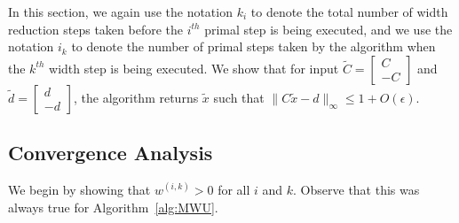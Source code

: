 \documentclass[11pt]{article}
\newcommand\dd{\boldsymbol{\mathit{d}}}
\newcommand\ww{\boldsymbol{\mathit{w}}}
\newcommand\xx{\boldsymbol{\mathit{x}}}
\newcommand\CC{\boldsymbol{\mathit{C}}}
\newcommand{\wt}{\widetilde}
\begin{document}
In this section, we again use the notation $k_i$ to denote the total number of width reduction steps taken before the $i^{th}$ primal step is being executed, and we use the notation $i_k$ to denote the number of primal steps taken by the algorithm when the $k^{th}$ width step is being executed. We show that for input $\wt{\CC} = \begin{bmatrix}\CC\\ -\CC    \end{bmatrix}$ and $\wt{\dd} = \begin{bmatrix}
   \dd\\ -\dd
\end{bmatrix}$, the algorithm returns $\wt{\xx}$ such that $\|\CC\wt{\xx}-\dd\|_{\infty}\leq 1+ O(\epsilon)$.

\subsection*{Convergence Analysis}
We begin by showing that $\ww^{(i,k)}>0$ for all $i$ and $k$. Observe that this was always true for Algorithm~\ref{alg:MWU}.
\end{document}
